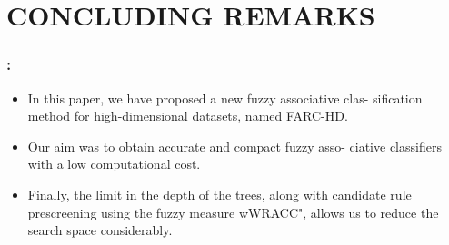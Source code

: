 \documentclass{beamer}
\begin{document}
\begin{CJK*}{UTF8}{bsmi}
\begin{frame}
\end{frame}


\section{CONCLUDING REMARKS}


\begin{frame}
	\frametitle{\insertsection : \insertsubsection}
	

		\begin{itemize}
			\item In this paper, we have proposed a new fuzzy associative clas- sification method for high-dimensional datasets, named FARC-HD.
			\item Our aim was to obtain accurate and compact fuzzy asso- ciative classifiers with a low computational cost.
			\item Finally, the limit in the depth of the trees, along with candidate rule prescreening using the fuzzy measure wWRACC", allows us to reduce the search space considerably.
		\end{itemize}

	
\end{frame}



\end{CJK*}
\end{document}
